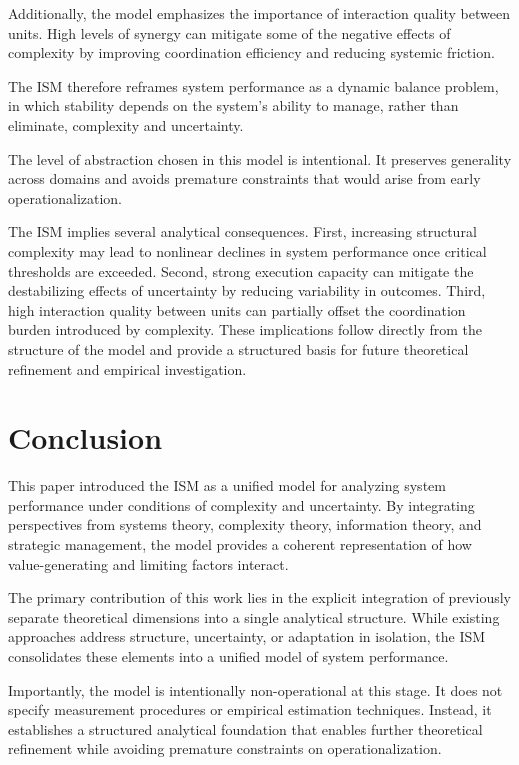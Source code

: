 \documentclass[11pt,a4paper]{article}
\theoremstyle{definition}
\begin{document}
Additionally, the model emphasizes the importance of interaction quality between units.
High levels of synergy can mitigate some of the negative effects of complexity by improving coordination efficiency and reducing systemic friction.

The \ac{ISM} therefore reframes system performance as a dynamic balance problem, in which stability depends on the system's ability to manage, rather than eliminate, complexity and uncertainty.

The level of abstraction chosen in this model is intentional.
It preserves generality across domains and avoids premature constraints that would arise from early operationalization.

The \ac{ISM} implies several analytical consequences.
First, increasing structural complexity may lead to nonlinear declines in system performance once critical thresholds are exceeded.
Second, strong execution capacity can mitigate the destabilizing effects of uncertainty by reducing variability in outcomes.
Third, high interaction quality between units can partially offset the coordination burden introduced by complexity.
These implications follow directly from the structure of the model and provide a structured basis for future theoretical refinement and empirical investigation.


\section{Conclusion}
\label{sec:conclusion}

This paper introduced the \ac{ISM} as a unified model for analyzing system performance under conditions of complexity and uncertainty.
By integrating perspectives from systems theory, complexity theory, information theory, and strategic management, the model provides a coherent representation of how value-generating and limiting factors interact.

The primary contribution of this work lies in the explicit integration of previously separate theoretical dimensions into a single analytical structure.
While existing approaches address structure, uncertainty, or adaptation in isolation, the \ac{ISM} consolidates these elements into a unified model of system performance.

Importantly, the model is intentionally non-operational at this stage.
It does not specify measurement procedures or empirical estimation techniques.
Instead, it establishes a structured analytical foundation that enables further theoretical refinement while avoiding premature constraints on operationalization.
\end{document}
